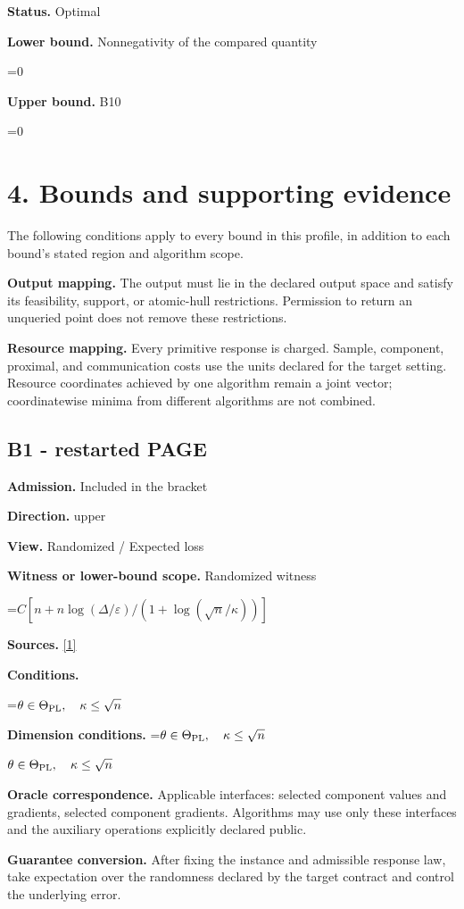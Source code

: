 \documentclass[10pt,a4paper]{article}
\newcommand{\AtlasMath}[1]{\par\begingroup\centering\setbox0=\hbox{$\displaystyle #1$}\ifdim\wd0>1.4\linewidth\typeout{ATLAS WIDE FORMULA: \the\wd0}\fi\ifdim\wd0>\linewidth\resizebox{\linewidth}{!}{\box0}\else\box0\fi\par\endgroup}
\newcommand{\AtlasInlineMath}[1]{\begingroup\setbox0=\hbox{$#1$}\ifdim\wd0>.4\linewidth\endgroup\AtlasMath{#1}\else\endgroup$#1$\fi}
\begin{document}
\textbf{Status.} Optimal

\textbf{Lower bound.} Nonnegativity of the compared quantity

\AtlasMath{0}
\textbf{Upper bound.} B10

\AtlasMath{0}
\section{4. Bounds and supporting evidence}
The following conditions apply to every bound in this profile, in addition to each bound's stated region and algorithm scope.

\textbf{Output mapping.} The output must lie in the declared output space and satisfy its feasibility, support, or atomic-hull restrictions. Permission to return an unqueried point does not remove these restrictions.

\textbf{Resource mapping.} Every primitive response is charged. Sample, component, proximal, and communication costs use the units declared for the target setting. Resource coordinates achieved by one algorithm remain a joint vector; coordinatewise minima from different algorithms are not combined.

\subsection{B1 - restarted PAGE}
\textbf{Admission.} Included in the bracket

\textbf{Direction.} upper

\textbf{View.} Randomized / Expected loss

\textbf{Witness or lower-bound scope.} Randomized witness

\AtlasMath{C[n+n\log(\Delta/\varepsilon)/(1+\log(\sqrt n/\kappa))]}
\textbf{Sources.} \href{https://arxiv.org/pdf/2609.00045v3}{[1]}

\textbf{Conditions.} 
\AtlasMath{\theta\in\Theta_{\rm PL},\quad\kappa\le\sqrt n}


\textbf{Dimension conditions.} \AtlasInlineMath{\theta\in\Theta_{\rm PL},\quad\kappa\le\sqrt n}

\textbf{Oracle correspondence.} Applicable interfaces: selected component values and gradients, selected component gradients. Algorithms may use only these interfaces and the auxiliary operations explicitly declared public.

\textbf{Guarantee conversion.} After fixing the instance and admissible response law, take expectation over the randomness declared by the target contract and control the underlying error.
\end{document}
